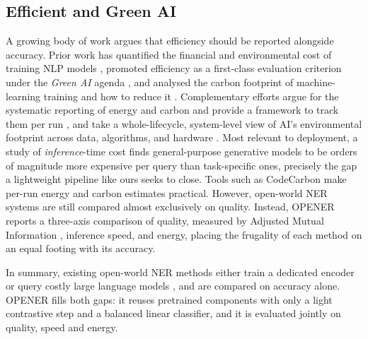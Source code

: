\subsection{Efficient and Green AI}
\label{sec:related:green}
A growing body of work argues that efficiency should be reported alongside accuracy.
Prior work has quantified the financial and environmental cost of training NLP models \cite{strubell2019energy}, promoted efficiency as a first-class evaluation criterion under the \emph{Green AI} agenda \cite{schwartz2020greenai}, and analysed the carbon footprint of machine-learning training and how to reduce it \cite{patterson2022carbon}.
Complementary efforts argue for the systematic reporting of energy and carbon and provide a framework to track them per run \cite{henderson2020systematic}, and take a whole-lifecycle, system-level view of AI's environmental footprint across data, algorithms, and hardware \cite{wu2022sustainable}.
Most relevant to deployment, a study of \emph{inference}-time cost \cite{luccioni2024power} finds general-purpose generative models to be orders of magnitude more expensive per query than task-specific ones, precisely the gap a lightweight pipeline like ours seeks to close.
Tools such as CodeCarbon \cite{luccioni2019quantifying} make per-run energy and carbon estimates practical.
However, open-world NER systems are still compared almost exclusively on quality.
Instead, OPENER reports a three-axis comparison of quality, measured by Adjusted Mutual Information \cite{vinh2010ami}, inference speed, and energy, placing the frugality of each method on an equal footing with its accuracy.

In summary, existing open-world NER methods either train a dedicated encoder \cite{genest2025owner} or query costly large language models \cite{zhou2024universalner, sainz2024gollie}, and are compared on accuracy alone.
OPENER fills both gaps: it reuses pretrained components with only a light contrastive step and a balanced linear classifier, and it is evaluated jointly on quality, speed and energy.

